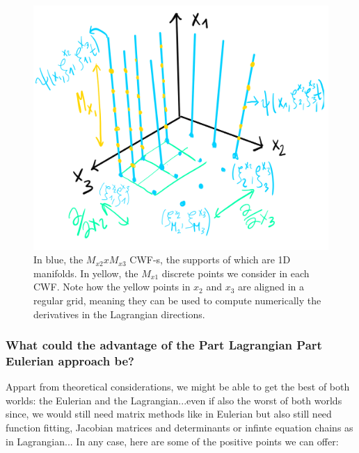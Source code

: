 \documentclass[11pt, a4paper]{article} %
\begin{document}
\begin{figure}[h!]
  \centering
    \includegraphics[width=0.5\linewidth]{rectas.png}
  \caption{In blue, the $M_{x2}xM_{x3}$ CWF-s, the supports of which are 1D manifolds. In yellow, the $M_{x1}$ discrete points we consider in each CWF. Note how the yellow points in $x_2$ and $x_3$ are aligned in a regular grid, meaning they can be used to compute numerically the derivatives in the Lagrangian directions.  }
  \label{fig:lines}
\end{figure}





\subsubsection*{What could the advantage of the Part Lagrangian Part Eulerian approach be?}
Appart from theoretical considerations, we might be able to get the best of both worlds: the Eulerian and the Lagrangian...even if also the worst of both worlds since, we would still need matrix methods like in Eulerian but also still need function fitting, Jacobian matrices and determinants or infinte equation chains as in Lagrangian... In any case, here are some of the positive points we can offer:
\end{document}
